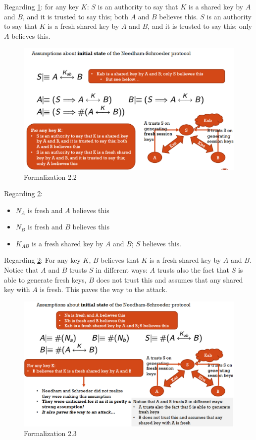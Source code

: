 Regarding \ref{fig:formalization22}:
for any key $K$: $S$ is an authority to say that $K$ is a shared key by $A$ and $B$, and it is trusted to say this; both $A$ and $B$ believes this. $S$ is an authority to say that $K$ is a fresh shared key by $A$ and $B$, and it is trusted to say this; only $A$ believes this.

\begin{figure}
	\centering
	\includegraphics[width=0.7\linewidth]{Images/Chapter4/formalization22}
	\caption{Formalization 2.2}
	\label{fig:formalization22}
\end{figure}


Regarding \ref{fig:formalization23}:
\begin{itemize}
	\item $N_{A}$ is fresh and $A$ believes this
	\item $N_{B}$ is fresh and $B$ believes this
	\item $K_{AB}$ is a fresh shared key by $A$ and $B$; $S$ believes this. 
\end{itemize}


Regarding \ref{fig:formalization23}: For any key $K$, $B$ believes that $K$ is a fresh shared key by $A$ and $B$. 
Notice that $A$ and $B$ trusts $S$ in different ways: $A$ trusts also the fact that $S$ is able to generate fresh keys, $B$ does not trust this and assumes that any shared key with $A$ is fresh. This paves the way to the attack.

\begin{figure}
	\centering
	\includegraphics[width=0.7\linewidth]{Images/Chapter4/formalization23}
	\caption{Formalization 2.3}
	\label{fig:formalization23}
\end{figure}

